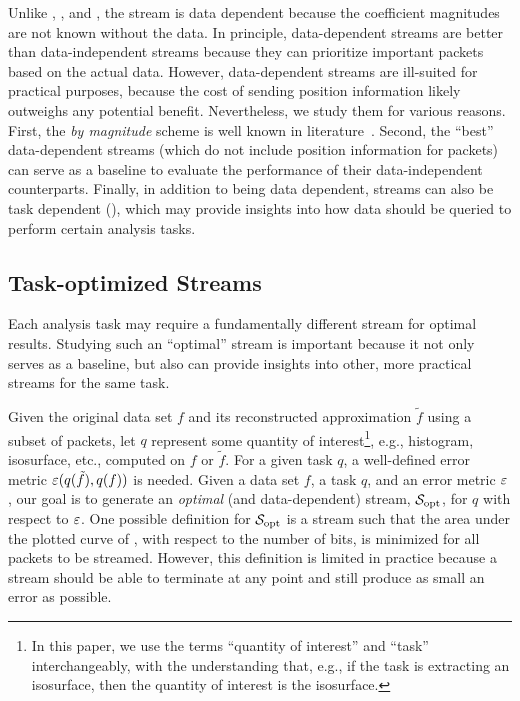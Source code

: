 Unlike \slvl, \sbit, and \swav, the \smag stream is data dependent because the coefficient
magnitudes are not known without the data.
%
In principle, data-dependent streams are better than data-independent streams because they can
prioritize important packets based on the actual data. However, data-dependent streams are
ill-suited for practical purposes, because the cost of sending position information likely outweighs
any potential benefit. Nevertheless, we study them for various reasons. First, the \emph{by
magnitude} scheme is well known in literature~\cite{vapor2007}. Second, the ``best'' data-dependent
streams (which do not include position information for packets) can serve as a baseline to evaluate
the performance of their data-independent counterparts. Finally, in addition to being data
dependent, streams can also be task dependent (), which may provide
insights into how data should be queried to perform certain analysis tasks.

\subsection{Task-optimized Streams} \label{sec:data_dep_streams}

Each analysis task may require a fundamentally different stream for optimal results. Studying such
an ``optimal'' stream is important because it not only serves as a baseline,
but also can provide insights into other, more practical streams for the same task.

Given the original data set $f$ and its reconstructed approximation $\tilde{f}$ using a subset of
packets, let $q$ represent some quantity of interest\footnote{In this paper, we use the terms
``quantity of interest'' and ``task'' interchangeably, with the understanding that, e.g., if the
task is extracting an isosurface, then the quantity of interest is the isosurface.}, e.g.,
histogram, isosurface, etc., computed on $f$ or $\tilde{f}$. For a given task $q$, a well-defined
error metric $\err(q(\tilde{f}),q(f))$ is needed. Given a data set $f$, a task $q$, and an error
metric $\err$, our goal is to generate an \emph{optimal} (and data-dependent) stream, $\sopt$, for
$q$ with respect to $\err$. One possible definition for $\sopt$ is a stream such that the area under
the plotted curve of \err, with respect to the number of bits, is minimized for all packets to be
streamed. However, this definition is limited in practice because a stream should be able to
terminate at any point and still produce as small an error as possible.

